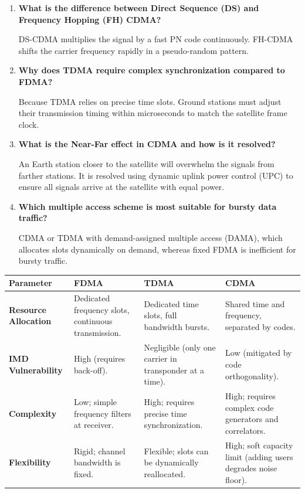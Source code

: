 \documentclass[12pt,a4paper]{article}
\newcommand{\Q}[1]{\textbf{#1}\par\noindent\ignorespaces}
\renewcommand{\arraystretch}{1.45}
\begin{document}
\begin{tcolorbox}[exambox, title={\textbf{Frequently Asked / Viva Questions}}]
\begin{enumerate}[topsep=0pt, label=\textbf{Q\arabic*.}, itemsep=5pt]
  \item \Q{What is the difference between Direct Sequence (DS) and Frequency Hopping (FH) CDMA?}
    DS-CDMA multiplies the signal by a fast PN code continuously. FH-CDMA shifts the carrier frequency rapidly in a pseudo-random pattern.
  \item \Q{Why does TDMA require complex synchronization compared to FDMA?}
    Because TDMA relies on precise time slots. Ground stations must adjust their transmission timing within microseconds to match the satellite frame clock.
  \item \Q{What is the Near-Far effect in CDMA and how is it resolved?}
    An Earth station closer to the satellite will overwhelm the signals from farther stations. It is resolved using dynamic uplink power control (UPC) to ensure all signals arrive at the satellite with equal power.
  \item \Q{Which multiple access scheme is most suitable for bursty data traffic?}
    CDMA or TDMA with demand-assigned multiple access (DAMA), which allocates slots dynamically on demand, whereas fixed FDMA is inefficient for bursty traffic.
\end{enumerate}
\end{tcolorbox}

\begin{tcolorbox}[tikzbox, title={Comparison of FDMA, TDMA, and CDMA}]
\renewcommand{\arraystretch}{1.4}
\par\noindent
{\renewcommand{\arraystretch}{1.55}%
\begin{tabularx}{\linewidth}{|B{3.2cm}|Y|Y|Y|}\hline
\textbf{Parameter} & \textbf{\color{myteal}FDMA} & \textbf{\color{myred}TDMA} & \textbf{\color{myamber}CDMA} \\[4pt]
\hline
\textbf{Resource Allocation} & Dedicated frequency slots, continuous transmission. & Dedicated time slots, full bandwidth bursts. & Shared time and frequency, separated by codes. \\[4pt]
\hline
\textbf{IMD Vulnerability} & High (requires back-off). & Negligible (only one carrier in transponder at a time). & Low (mitigated by code orthogonality). \\[4pt]
\hline
\textbf{Complexity} & Low; simple frequency filters at receiver. & High; requires precise time synchronization. & High; requires complex code generators and correlators. \\[4pt]
\hline
\textbf{Flexibility} & Rigid; channel bandwidth is fixed. & Flexible; slots can be dynamically reallocated. & High; soft capacity limit (adding users degrades noise floor). \\[4pt]
\hline
\end{tabularx}
}
\end{tcolorbox}
\end{document}
